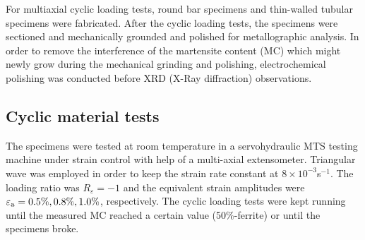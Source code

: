 \documentclass[final,5p,times,onecolumn,10pt,sort&compress]{elsarticle}
\begin{document}



For multiaxial cyclic loading tests, round bar specimens and thin-walled tubular specimens were fabricated. After the cyclic loading tests, the specimens were sectioned and mechanically grounded and polished for metallographic analysis. In order to remove the interference of the martensite content (MC) which might newly grow during the mechanical grinding and polishing, electrochemical polishing was conducted before XRD (X-Ray diffraction) observations.

\subsection{Cyclic material tests}

The specimens were tested at room temperature in a servohydraulic MTS testing machine under strain control with help of a multi-axial extensometer. Triangular wave was employed in order to keep the strain rate constant at $8\times 10^{-3}$s$^{-1}$. The loading ratio was $R_{\varepsilon }=-1$ and the equivalent strain amplitudes were $\varepsilon_{\rm a}=0.5\%,0.8\%,1.0\%$, respectively. The cyclic loading tests were kept running until the measured MC reached a certain value (50\%-ferrite) or until the specimens broke.
\end{document}
